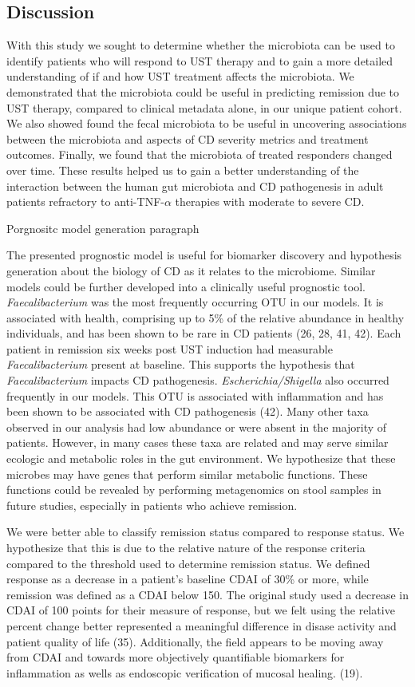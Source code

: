 \documentclass[11pt,]{article}
\begin{document}
\subsection{Discussion}\label{discussion}

With this study we sought to determine whether the microbiota can be
used to identify patients who will respond to UST therapy and to gain a
more detailed understanding of if and how UST treatment affects the
microbiota. We demonstrated that the microbiota could be useful in
predicting remission due to UST therapy, compared to clinical metadata
alone, in our unique patient cohort. We also showed found the fecal
microbiota to be useful in uncovering associations between the
microbiota and aspects of CD severity metrics and treatment outcomes.
Finally, we found that the microbiota of treated responders changed over
time. These results helped us to gain a better understanding of the
interaction between the human gut microbiota and CD pathogenesis in
adult patients refractory to anti-TNF-\({\alpha}\) therapies with
moderate to severe CD.

Porgnositc model generation paragraph

The presented prognostic model is useful for biomarker discovery and
hypothesis generation about the biology of CD as it relates to the
microbiome. Similar models could be further developed into a clinically
useful prognostic tool. \emph{Faecalibacterium} was the most frequently
occurring OTU in our models. It is associated with health, comprising up
to 5\% of the relative abundance in healthy individuals, and has been
shown to be rare in CD patients (26, 28, 41, 42). Each patient in
remission six weeks post UST induction had measurable
\emph{Faecalibacterium} present at baseline. This supports the
hypothesis that \emph{Faecalibacterium} impacts CD pathogenesis.
\emph{Escherichia/Shigella} also occurred frequently in our models. This
OTU is associated with inflammation and has been shown to be associated
with CD pathogenesis (42). Many other taxa observed in our analysis had
low abundance or were absent in the majority of patients. However, in
many cases these taxa are related and may serve similar ecologic and
metabolic roles in the gut environment. We hypothesize that these
microbes may have genes that perform similar metabolic functions. These
functions could be revealed by performing metagenomics on stool samples
in future studies, especially in patients who achieve remission.

We were better able to classify remission status compared to response
status. We hypothesize that this is due to the relative nature of the
response criteria compared to the threshold used to determine remission
status. We defined response as a decrease in a patient's baseline CDAI
of 30\% or more, while remission was defined as a CDAI below 150. The
original study used a decrease in CDAI of 100 points for their measure
of response, but we felt using the relative percent change better
represented a meaningful difference in disase activity and patient
quality of life (35). Additionally, the field appears to be moving away
from CDAI and towards more objectively quantifiable biomarkers for
inflammation as wells as endoscopic verification of mucosal healing.
(19).
\end{document}
